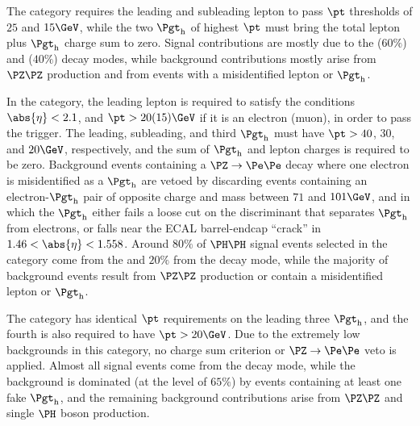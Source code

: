 The \lltt category requires
the leading and subleading lepton to pass $\pt$ thresholds of $25$ and $15\GeV$, 
while the two $\tauh$ of highest $\pt$ must bring the total lepton plus $\tauh$ charge sum to zero.
Signal contributions are mostly due to the \WWtt ($60\%$) and \tttt ($40\%$) decay modes, 
while background contributions mostly arise from $\PZ\PZ$ production and from events with a misidentified lepton or $\tauh$.

In the \lttt category,
the leading lepton is required to satisfy the conditions 
$\abs{\eta} < 2.1$, and $\pt > 20 (15)\GeV$ if it is an electron (muon),
in order to pass the trigger.
The leading, subleading, and third
$\tauh$ must have $\pt > 40$, $30$, and $20\GeV$, respectively, and the sum of $\tauh$ and lepton charges is required to be zero.
Background events containing a $\Zee$ decay where one electron is misidentified
as a $\tauh$ are vetoed by discarding events containing an electron-$\tauh$ pair of opposite charge
and mass between $71$ and $101\GeV$, and in which the $\tauh$ either fails a loose cut on the discriminant that separates $\tauh$ from electrons,
or falls near the ECAL barrel-endcap ``crack'' in $1.46 < \abs{\eta} < 1.558$.  Around $80\%$ of $\HH$ signal events selected in the \lttt category
come from the \tttt and $20\%$ from the \WWtt decay mode, while the majority of
background events result from $\PZ\PZ$ production or contain a misidentified lepton or $\tauh$.

The \noltttt category has identical $\pt$ requirements on the leading three $\tauh$,
and the fourth \tauh is also required to have $\pt > 20\GeV$.  Due to the extremely
low backgrounds in this category, no charge sum criterion or $\Zee$ veto is applied.  Almost
all signal events come from the \tttt decay mode, while the background is dominated (at the level of $65\%$) by events 
containing at least one fake $\tauh$, and the remaining background contributions arise from $\PZ\PZ$ and single
$\PHiggs$ boson production.

